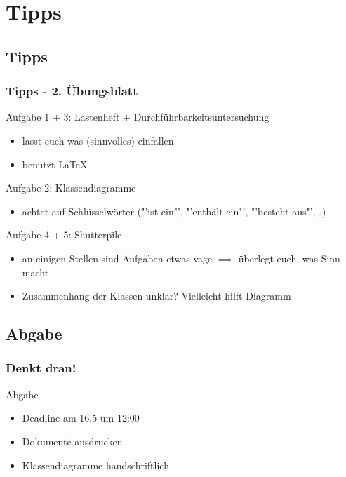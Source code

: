 \documentclass[18pt]{beamer}
\begin{document}
\section{Tipps}
	\subsection{Tipps}
	\begin{frame}
		\frametitle{Tipps - 2. Übungsblatt}
		\begin{small}
			\begin{exampleblock}{Aufgabe 1 + 3: Lastenheft + Durchführbarkeitsuntersuchung}
				\begin{itemize}
					\item lasst euch was (sinnvolles) einfallen
					\item benutzt \LaTeX
				\end{itemize}
			\end{exampleblock}
			\pause
			\begin{exampleblock}{Aufgabe 2: Klassendiagramme}
				\begin{itemize}
					\item achtet auf Schlüsselwörter ("'ist ein"', "'enthält ein"', "'besteht aus"',\dots)
				\end{itemize}
			\end{exampleblock}
			\pause
			\begin{exampleblock}{Aufgabe 4 + 5: Shutterpile}
				\begin{itemize}
					\item an einigen Stellen sind Aufgaben etwas vage
					\linebreak $\implies$ überlegt euch, was Sinn macht
					\item Zusammenhang der Klassen unklar? Vielleicht hilft Diagramm
				\end{itemize}
			\end{exampleblock}
		\end{small}
	\end{frame}
	
	\subsection{Abgabe}
	\begin{frame}
		\frametitle{Denkt dran!}
		\begin{alertblock}{Abgabe}
			\begin{itemize}
				\item Deadline am 16.5 um 12:00
				\item Dokumente ausdrucken
				\item Klassendiagramme handschriftlich
			\end{itemize}
		\end{alertblock}
	\end{frame}
		
\end{document}

